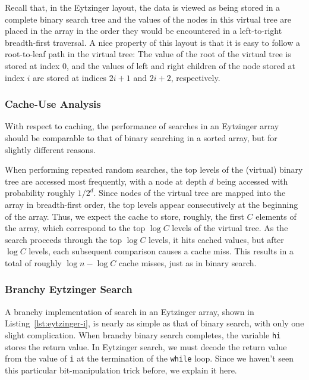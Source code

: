\documentclass{patmorin}
\newcommand{\lstref}[1]{Listing~\ref{lst:#1}}
\begin{document}
Recall that, in the Eytzinger layout, the data is viewed as being
stored in a complete binary search tree and the values of the nodes in
this virtual tree are placed in the array in the order they would be
encountered in a left-to-right breadth-first traversal.  A nice property
of this layout is that it is easy to follow a root-to-leaf path in the
virtual tree: The value of the root of the virtual tree is stored at
index 0, and the values of left and right children of the node stored
at index $i$ are stored at indices $2i+1$ and $2i+2$, respectively.


\subsubsection{Cache-Use Analysis}

With respect to caching, the performance of searches in an Eytzinger
array should be comparable to that of binary searching in a sorted array,
but for slightly different reasons.

When performing repeated random searches, the top levels of the (virtual)
binary tree are accessed most frequently, with a node at depth $d$
being accessed with probability roughly $1/2^d$.  Since nodes of the
virtual tree are mapped into the array in breadth-first order, the
top levels appear consecutively at the beginning of the array. Thus,
we expect the cache to store, roughly, the first $C$ elements of the
array, which correspond to the top $\log C$ levels of the virtual tree.
As the search proceeds through the top $\log C$ levels, it hits cached
values, but after $\log C$ levels, each subsequent comparison causes
a cache miss.  This results in a total of roughly $\log n-\log C$ cache
misses, just as in binary search.



\subsubsection{Branchy Eytzinger Search}

A branchy implementation of search in an Eytzinger array, shown in
\lstref{eytzinger-i}, is nearly as simple as that of binary search, with
only one slight complication. When branchy binary search completes, the
variable \texttt{hi} stores the return value. In Eytzinger search,
we must decode the return value from the value of \texttt{i}
at the termination of the \texttt{while} loop.  Since we haven't seen
this particular bit-manipulation trick before, we explain it here.
\end{document}
